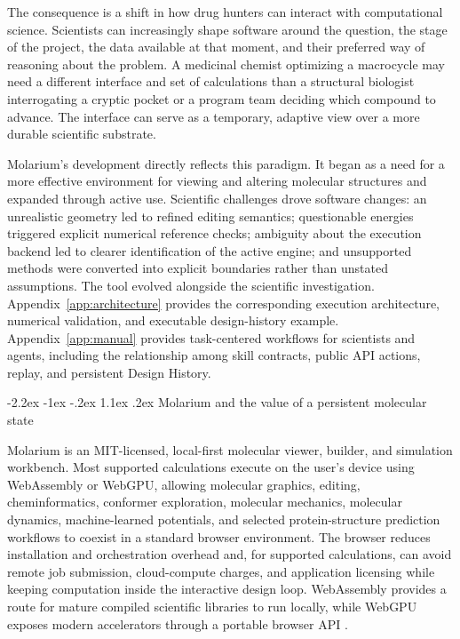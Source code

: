 \documentclass[11pt]{article}
\makeatletter
\renewcommand\section{\@startsection{section}{1}{\z@}%
  {-2.2ex \@plus -1ex \@minus -.2ex}%
  {1.1ex \@plus .2ex}%
  {\normalfont\Large\bfseries\color{molblue}}}
\makeatother
\begin{document}
The consequence is a shift in how drug hunters can interact with computational science. Scientists can increasingly shape software around the question, the stage of the project, the data available at that moment, and their preferred way of reasoning about the problem. A medicinal chemist optimizing a macrocycle may need a different interface and set of calculations than a structural biologist interrogating a cryptic pocket or a program team deciding which compound to advance. The interface can serve as a temporary, adaptive view over a more durable scientific substrate.

Molarium's development directly reflects this paradigm. It began as a need for a more effective environment for viewing and altering molecular structures and expanded through active use. Scientific challenges drove software changes: an unrealistic geometry led to refined editing semantics; questionable energies triggered explicit numerical reference checks; ambiguity about the execution backend led to clearer identification of the active engine; and unsupported methods were converted into explicit boundaries rather than unstated assumptions. The tool evolved alongside the scientific investigation. Appendix~\ref{app:architecture} provides the corresponding execution architecture, numerical validation, and executable design-history example. Appendix~\ref{app:manual} provides task-centered workflows for scientists and agents, including the relationship among skill contracts, public API actions, replay, and persistent Design History.

\section{Molarium and the value of a persistent molecular state}

Molarium is an MIT-licensed, local-first molecular viewer, builder, and simulation workbench. Most supported calculations execute on the user's device using WebAssembly or WebGPU, allowing molecular graphics, editing, cheminformatics, conformer exploration, molecular mechanics, molecular dynamics, machine-learned potentials, and selected protein-structure prediction workflows to coexist in a standard browser environment. The browser reduces installation and orchestration overhead and, for supported calculations, can avoid remote job submission, cloud-compute charges, and application licensing while keeping computation inside the interactive design loop. WebAssembly provides a route for mature compiled scientific libraries to run locally, while WebGPU exposes modern accelerators through a portable browser API \citep{haas2017wasm,webgpu2025}.
\end{document}
